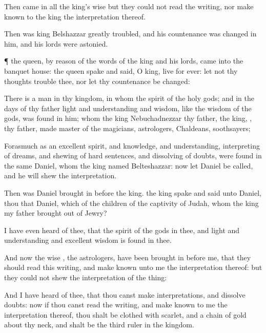 {Then
came in
all the
king’s
wise
{} but they
could
not
read the
writing, nor make
known to the
king the
interpretation thereof.

Then was
king
Belshazzar
greatly
troubled, and his
countenance was
changed in
him, and his
lords were
astonied.


\par }{\PP {}¶
{} the
queen, by
reason of the
words of the
king and his
lords,
came into the
banquet
house:
{} the
queen
spake and
said, O
king,
live for
ever: let
not thy
thoughts
trouble thee, nor let thy
countenance be
changed:

There
is a
man in thy
kingdom, in whom
{} the
spirit of the
holy
gods; and in the
days of thy
father
light and
understanding and
wisdom, like the
wisdom of the
gods, was
found in him; whom the
king
Nebuchadnezzar thy
father, the
king,
{}, thy
father,
made
master of the
magicians,
astrologers,
Chaldeans,
{}
soothsayers;

Forasmuch
as an
excellent
spirit, and
knowledge, and
understanding,
interpreting of
dreams, and
shewing of hard
sentences, and
dissolving of
doubts, were
found in the same
Daniel, whom the
king
named
Belteshazzar:
now let
Daniel be
called, and he will
shew the
interpretation.

Then was
Daniel brought
in
before the
king.
{} the
king
spake and
said unto
Daniel,
{}
thou that
Daniel, which
{}
of the
children of the
captivity of
Judah, whom the
king my
father
brought out
of
Jewry?

I have even
heard of thee, that the
spirit of the
gods
{} in
thee, and
{}
light and
understanding and
excellent
wisdom is
found in thee.

And
now the
wise
{}, the
astrologers, have been
brought in
before me, that they should
read
this
writing, and make
known unto me the
interpretation thereof: but they
could
not
shew the
interpretation of the
thing:

And
I have
heard of
thee, that thou
canst
make
interpretations, and
dissolve
doubts:
now
if thou
canst
read the
writing, and make
known to me the
interpretation thereof, thou shalt be
clothed with
scarlet, and
{} a
chain of
gold
about thy
neck, and shalt be the
third
ruler in the
kingdom.


}
